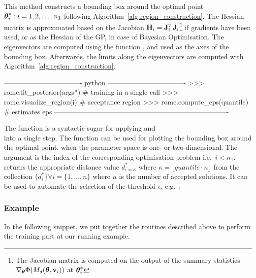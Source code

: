 \noindent
This method constructs a bounding box around the optimal point
\(\boldsymbol{\theta}_i^* : i = 1, 2, \ldots, n_1\) following
Algorithm~\ref{alg:region_construction}. The Hessian matrix is
approximated based on the Jacobian
\(\mathbf{H}_i = \mathbf{J}_i^T \mathbf{J}_i\)\footnote{The Jacobian matrix is computed
  on the output of the summary statistics
  \(\nabla_{\boldsymbol{\theta}} \Phi(M_d(\boldsymbol{\theta}, \mathbf{v}_i))\) at \(\boldsymbol{\theta}_i^*\)} if
gradients have been used, or as the Hessian of the GP, in case of
Bayesian Optimisation. The eigenvectors are computed using the function
, and used as the axes of the
bounding box. Afterwards, the limits along the
eigenvectors are computed with
Algorithm~\ref{alg:region_construction}.

\begin{Code}
---------------------------------- python ----------------------------------
>>> romc.fit_posterior(args*)  # training in a single call
>>> romc.visualize_region(i)   # acceptance region
>>> romc.compute_eps(quantile) # estimates eps
----------------------------------------------------------------------------
\end{Code}

\noindent
The function  is a syntactic sugar for applying
 and \\  into a single
step. The function  can be used for plotting
the bounding box around the optimal point, when the parameter space is
one- or two-dimensional. The argument  is the index of the corresponding
optimisation problem i.e.\ \(i<n_1\).  returns the
appropriate distance value \(d_{i=\kappa}^*\) where
\(\kappa = \lfloor quantile \cdot n \rfloor\) from the collection
\(\{ d_i^* \} \forall i = \{1, \ldots, n\}\) where \(n\) is the number of
accepted solutions. It can be used to automate the selection of the
threshold \(\epsilon\), e.g.\ .


\subsubsection*{Example}


In the following snippet, we put together the routines described above
to perform the training part at our running example.

